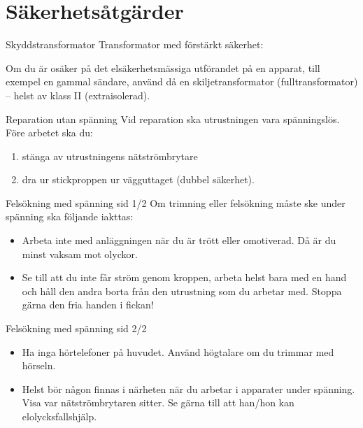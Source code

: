 \documentclass{beamer}
\begin{document}
\section{Säkerhetsåtgärder}
\begin{frame}{Skyddstransformator}
Transformator med förstärkt säkerhet:

\begin{center}
	\begin{minipage}{0.19\columnwidth}
		\Huge{\selectfont{}\relax}
	\end{minipage}
	\begin{minipage}{0.7\columnwidth}
		Om du är osäker på det elsäkerhetsmässiga utförandet på en
		apparat, till exempel en gammal sändare, använd då en skiljetransformator
		(fulltransformator) -- helst av klass II (extraisolerad).
	\end{minipage}
\end{center}
\end{frame}

\begin{frame}{Reparation utan spänning}
Vid reparation ska utrustningen vara spänningslös.
Före arbetet ska du:

\begin{enumerate}
	\item stänga av utrustningens nätströmbrytare
	\item dra ur stickproppen ur vägguttaget (dubbel säkerhet).
\end{enumerate}
\end{frame}

\begin{frame}{Felsökning med spänning sid 1/2}
Om trimning eller felsökning måste ske under spänning ska följande iakttas:
\begin{itemize}
	\item Arbeta inte med anläggningen när du är trött eller omotiverad.
	Då är du minst vaksam mot olyckor.
	\item Se till att du inte får ström genom kroppen, arbeta helst bara med en
	hand och håll den andra borta från den utrustning som du arbetar med.
	Stoppa gärna den fria handen i fickan!
\end{itemize}
\end{frame}

\begin{frame}{Felsökning med spänning sid 2/2}
\begin{itemize}
	\item Ha inga hörtelefoner på huvudet.
	Använd högtalare om du trimmar med hörseln.
	\item Helst bör någon finnas i närheten när du arbetar i apparater under
	spänning.
	Visa var nätströmbrytaren sitter.
	Se gärna till att han/hon kan elolycksfallshjälp.
\end{itemize}
\end{frame}
\end{document}
